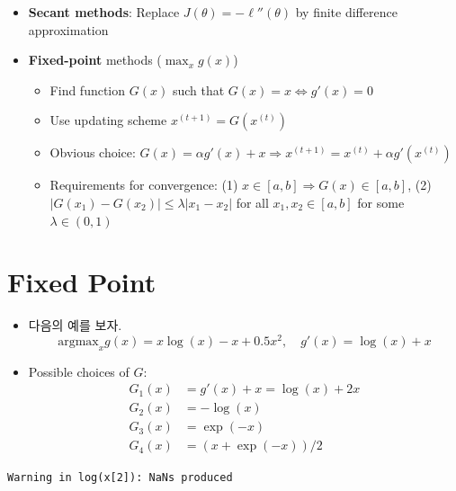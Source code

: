 \documentclass[
  letterpaper,
  DIV=11,
  numbers=noendperiod]{scrreprt}
\providecommand{\tightlist}{%
  \setlength{\itemsep}{0pt}\setlength{\parskip}{0pt}}\usepackage{longtable,booktabs,array}
\theoremstyle{definition}
\theoremstyle{definition}
\theoremstyle{remark}
\begin{document}
\begin{itemize}
\item
  \textbf{Secant methods}: Replace \(J(\theta) = -\ell '' (\theta)\) by
  finite difference approximation
\item
  \textbf{Fixed-point} methods (\(\max_x g(x)\))

  \begin{itemize}
  \tightlist
  \item
    Find function \(G(x)\) such that
    \(G(x) = x \Longleftrightarrow g'(x) = 0\)
  \item
    Use updating scheme \(x^{(t+1)} = G(x^{(t)})\)
  \item
    Obvious choice:
    \(G(x) = \alpha g' (x) + x \Longrightarrow x^{(t+1)} = x^{(t)} + \alpha g'(x^{(t)})\)
  \item
    Requirements for convergence: (1)
    \(x \in [a,b] \Longrightarrow G(x) \in [a,b]\), (2)
    \(|G(x_1) - G(x_2) | \leq \lambda |x_1 - x_2|\) for all
    \(x_1, x_2 \in [a,b]\) for some \(\lambda \in (0,1)\)
  \end{itemize}
\end{itemize}

\section{Fixed Point}\label{fixed-point}

\begin{itemize}
\item
  다음의 예를 보자. \[
  \text{argmax}_{x} g(x) = x\log (x) - x + 0.5x^2, \quad{} g'(x) = \log (x) + x
  \]
\item
  Possible choices of \(G\): \[
  \begin{align*}
  G_1 (x) &= g'(x) + x = \log (x) + 2x\\
  G_2 (x) &= - \log (x)\\
  G_3 (x) &= \exp (-x)\\
  G_4 (x) &= (x+\exp(-x))/2
  \end{align*}
  \]
\end{itemize}

\begin{verbatim}
Warning in log(x[2]): NaNs produced
\end{verbatim}
\end{document}
